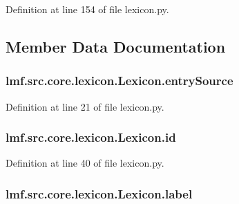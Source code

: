 Definition at line 154 of file lexicon.\+py.



\subsection{Member Data Documentation}
\hypertarget{classlmf_1_1src_1_1core_1_1lexicon_1_1_lexicon_a2c62e9663fe3771e684fb4ef94fe1d52}{
\subsubsection[{entry\+Source}]{\setlength{\rightskip}{0pt plus 5cm}lmf.\+src.\+core.\+lexicon.\+Lexicon.\+entry\+Source}}\label{classlmf_1_1src_1_1core_1_1lexicon_1_1_lexicon_a2c62e9663fe3771e684fb4ef94fe1d52}


Definition at line 21 of file lexicon.\+py.

\hypertarget{classlmf_1_1src_1_1core_1_1lexicon_1_1_lexicon_a8d47ac22571af27a1e989c2c7b14e80b}{
\subsubsection[{id}]{\setlength{\rightskip}{0pt plus 5cm}lmf.\+src.\+core.\+lexicon.\+Lexicon.\+id}}\label{classlmf_1_1src_1_1core_1_1lexicon_1_1_lexicon_a8d47ac22571af27a1e989c2c7b14e80b}


Definition at line 40 of file lexicon.\+py.

\hypertarget{classlmf_1_1src_1_1core_1_1lexicon_1_1_lexicon_a728727809066956b10125e62a954c9c5}{
\subsubsection[{label}]{\setlength{\rightskip}{0pt plus 5cm}lmf.\+src.\+core.\+lexicon.\+Lexicon.\+label}}\label{classlmf_1_1src_1_1core_1_1lexicon_1_1_lexicon_a728727809066956b10125e62a954c9c5}


